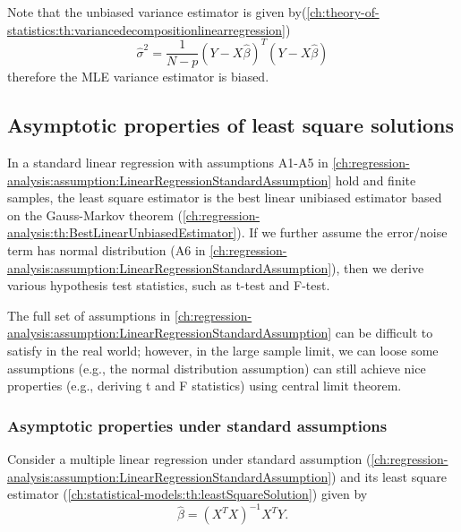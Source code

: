 \begin{refsection}
\begin{remark}
Note that the unbiased variance estimator is given by(\autoref{ch:theory-of-statistics:th:variancedecompositionlinearregression})
$$\hat{\sigma}^2 = \frac{1}{N-p}(Y-X\hat{\beta})^T(Y-X\hat{\beta})$$
therefore the MLE variance estimator is biased.
\end{remark}

\subsection{Asymptotic properties of least square solutions}

\begin{remark}[Motivation]
In a standard linear regression with assumptions A1-A5 in \autoref{ch:regression-analysis:assumption:LinearRegressionStandardAssumption} hold and finite samples, the least square estimator is the best linear unibiased estimator based on the Gauss-Markov theorem (\autoref{ch:regression-analysis:th:BestLinearUnbiasedEstimator}). If we further assume the error/noise term has normal distribution (A6 in \autoref{ch:regression-analysis:assumption:LinearRegressionStandardAssumption}), then we derive various hypothesis test statistics, such as t-test and F-test. 

The full set of assumptions in \autoref{ch:regression-analysis:assumption:LinearRegressionStandardAssumption} can be difficult to satisfy in the real world; however, in the large sample limit, we can loose some assumptions (e.g., the normal distribution assumption) can still achieve nice properties (e.g., deriving t and F statistics) using central limit theorem.
\end{remark}


\subsubsection{Asymptotic properties under standard assumptions}


\begin{lemma}[]
Consider a multiple linear regression under standard assumption (\autoref{ch:regression-analysis:assumption:LinearRegressionStandardAssumption}) and its least square estimator (\autoref{ch:statistical-models:th:leastSquareSolution}) given by
$$\hat{\beta} = (X^TX)^{-1}X^TY.$$


\end{lemma}
\end{refsection}
